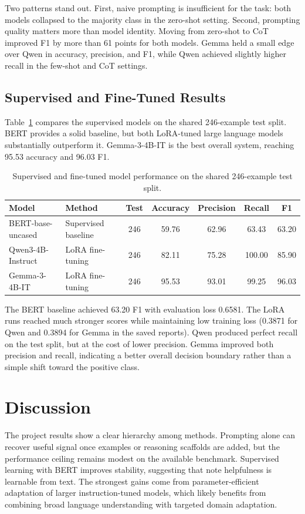 \documentclass[11pt]{article}
\begin{document}
	Two patterns stand out. First, naive prompting is insufficient for the task: both models collapsed to the majority class in the zero-shot setting. Second, prompting quality matters more than model identity. Moving from zero-shot to CoT improved F1 by more than 61 points for both models. Gemma held a small edge over Qwen in accuracy, precision, and F1, while Qwen achieved slightly higher recall in the few-shot and CoT settings.
	
	\subsection{Supervised and Fine-Tuned Results}
	Table~\ref{tab:supervised-results} compares the supervised models on the shared 246-example test split. BERT provides a solid baseline, but both LoRA-tuned large language models substantially outperform it. Gemma-3-4B-IT is the best overall system, reaching 95.53 accuracy and 96.03 F1.
	
	\begin{table}[t]
		\centering
		\small
		\begin{tabular}{llccccc}
			\toprule
			\textbf{Model} & \textbf{Method} & \textbf{Test} & \textbf{Accuracy} & \textbf{Precision} & \textbf{Recall} & \textbf{F1} \\
			\midrule
			BERT-base-uncased & Supervised baseline & 246 & 59.76 & 62.96 & 63.43 & 63.20 \\
			Qwen3-4B-Instruct & LoRA fine-tuning & 246 & 82.11 & 75.28 & 100.00 & 85.90 \\
			Gemma-3-4B-IT & LoRA fine-tuning & 246 & 95.53 & 93.01 & 99.25 & 96.03 \\
			\bottomrule
		\end{tabular}
		\caption{Supervised and fine-tuned model performance on the shared 246-example test split.}
		\label{tab:supervised-results}
	\end{table}
	
	The BERT baseline achieved 63.20 F1 with evaluation loss 0.6581. The LoRA runs reached much stronger scores while maintaining low training loss (0.3871 for Qwen and 0.3894 for Gemma in the saved reports). Qwen produced perfect recall on the test split, but at the cost of lower precision. Gemma improved both precision and recall, indicating a better overall decision boundary rather than a simple shift toward the positive class.
	
	\section{Discussion}
	The project results show a clear hierarchy among methods. Prompting alone can recover useful signal once examples or reasoning scaffolds are added, but the performance ceiling remains modest on the available benchmark. Supervised learning with BERT improves stability, suggesting that note helpfulness is learnable from text. The strongest gains come from parameter-efficient adaptation of larger instruction-tuned models, which likely benefits from combining broad language understanding with targeted domain adaptation.
	
\end{document}
